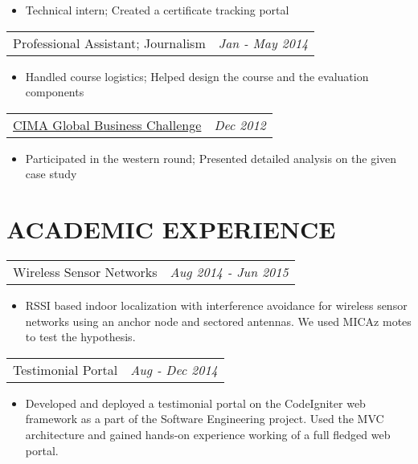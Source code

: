 \documentclass[margin]{res}
\begin{document}
\begin{resume}
\begin{tabular}{p{4.2in} r}
                  \end{tabular}	
                   \begin{itemize} %
                    \item[] Technical intern; Created a certificate tracking portal
		   \end{itemize} 
                  \begin{tabular}{p{4.2in} r}
                  Professional Assistant; Journalism &  \textit{Jan - May 2014 }
                 \end{tabular}	
		  \begin{itemize} 
                   \item[]  Handled course logistics; Helped design the course and the evaluation components
                  \end{itemize}
           \begin{tabular}{p{4.2in} r}
                  \href{http://www.cimaglobal.com/Events-and-cpd-courses/globalbusinesschallenge/}{CIMA Global Business Challenge} &  \textit{Dec 2012} 
                 \end{tabular}	
		  \begin{itemize} 
                   \item[]  Participated in the western round; Presented detailed analysis on the given case study
                  \end{itemize}
                   
\section{ACADEMIC EXPERIENCE}      
                  \begin{tabular}{p{4.2in} r}  %
                  Wireless Sensor Networks &  \textit{Aug 2014 - Jun 2015 }
                  \end{tabular}	
                   \begin{itemize} %
                    \item[] RSSI based indoor localization with interference avoidance for wireless sensor networks using an anchor node and sectored antennas. We used MICAz motes to test the hypothesis. 
		   \end{itemize} 
		   
                  \begin{tabular}{p{4.2in} r} %
                  Testimonial Portal &  \textit{Aug - Dec 2014}
                 \end{tabular}
                  \begin{itemize}					        
                   \item[] Developed and deployed a testimonial portal on the 		      CodeIgniter web framework as a part of the Software Engineering project. Used the MVC architecture and gained hands-on experience working of a full fledged web portal. 
                   

\end{itemize}
\end{resume}
\end{document}

